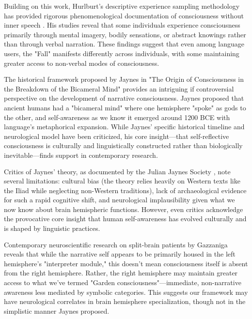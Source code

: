 Building on this work, Hurlburt's descriptive experience sampling methodology has provided rigorous phenomenological documentation of consciousness without inner speech \parencite{hurlburt2023descriptive}. His studies reveal that some individuals experience consciousness primarily through mental imagery, bodily sensations, or abstract knowings rather than through verbal narration. These findings suggest that even among language users, the "Fall" manifests differently across individuals, with some maintaining greater access to non-verbal modes of consciousness.

The historical framework proposed by Jaynes in "The Origin of Consciousness in the Breakdown of the Bicameral Mind" \parencite{jaynes1976origin} provides an intriguing if controversial perspective on the development of narrative consciousness. Jaynes proposed that ancient humans had a "bicameral mind" where one hemisphere "spoke" as gods to the other, and self-awareness as we know it emerged around 1200 BCE with language's metaphorical expansion. While Jaynes' specific historical timeline and neurological model have been criticized, his core insight—that self-reflective consciousness is culturally and linguistically constructed rather than biologically inevitable—finds support in contemporary research.

Critics of Jaynes' theory, as documented by the Julian Jaynes Society \parencite{julian2023critiques}, note several limitations: cultural bias (the theory relies heavily on Western texts like the Iliad while neglecting non-Western traditions), lack of archaeological evidence for such a rapid cognitive shift, and neurological implausibility given what we now know about brain hemispheric functions. However, even critics acknowledge the provocative core insight that human self-awareness has evolved culturally and is shaped by linguistic practices.

Contemporary neuroscientific research on split-brain patients by Gazzaniga \parencite{gazzaniga2022interpreter} reveals that while the narrative self appears to be primarily housed in the left hemisphere's "interpreter module," this doesn't mean consciousness itself is absent from the right hemisphere. Rather, the right hemisphere may maintain greater access to what we've termed "Garden consciousness"—immediate, non-narrative awareness less mediated by symbolic categories. This suggests our framework may have neurological correlates in brain hemisphere specialization, though not in the simplistic manner Jaynes proposed.

